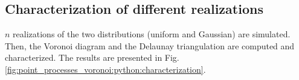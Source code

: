\subsection{Characterization of different realizations}
$n$ realizations of the two distributions (uniform and Gaussian) are simulated. Then, the Voronoi diagram and the Delaunay  triangulation are computed and characterized. The results are presented in Fig.\ref{fig:point_processes_voronoi:python:characterization}. 
% 
%             
%             
%             
%      
%         

